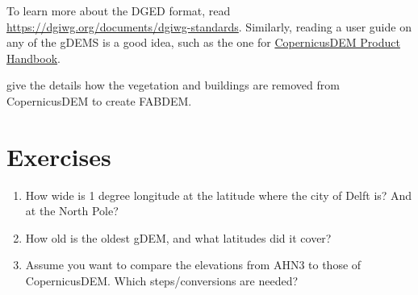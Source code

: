 To learn more about the DGED format, read \url{https://dgiwg.org/documents/dgiwg-standards}.
Similarly, reading a user guide on any of the gDEMS is a good idea, such as the one for \href{https://spacedata.copernicus.eu/documents/20126/0/GEO1988-CopernicusDEM-SPE-002_ProductHandbook_I3.0+%281%29.pdf}{CopernicusDEM Product Handbook}.

\citet{Hawker22} give the details how the vegetation and buildings are removed from CopernicusDEM to create FABDEM\@.

%
\section{Exercises}

\begin{enumerate}
  \item How wide is 1 degree longitude at the latitude where the city of Delft is? And at the North Pole?
  \item How old is the oldest gDEM, and what latitudes did it cover?
  \item Assume you want to compare the elevations from AHN3 to those of CopernicusDEM\@. Which steps/conversions are needed?
\end{enumerate}
